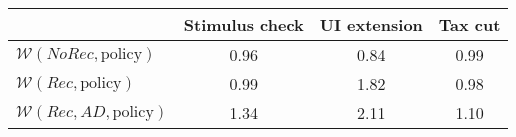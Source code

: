 \begin{tabular}{@{}lccc@{}} 
\toprule 
                          & Stimulus check      & UI extension    & Tax cut    \\  \midrule 
$\mathcal{W}(NoRec,\text{policy})$ & 0.96  & 0.84  & 0.99     \\ 
$\mathcal{W}(Rec,\text{policy})$ & 0.99  & 1.82  & 0.98     \\ 
$\mathcal{W}(Rec, AD,\text{policy})$ & 1.34  & 2.11  & 1.10     \\ 
\end{tabular}  
